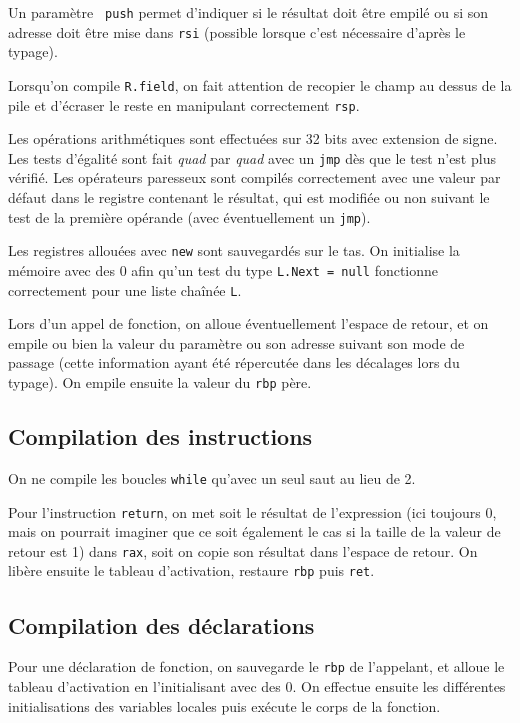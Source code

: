 \documentclass[a4paper, 10pt, french]{article}
\newcommand{\codeAda}[1]{\texttt{#1}}
\newcommand{\codeOCaml}[1]{\texttt{#1}}
\newcommand{\codeASM}[1]{\texttt{#1}}
\newcommand{\foreign}{\emph}
\begin{document}
Un paramètre \codeOCaml{~push} permet d'indiquer si le résultat doit être empilé ou si son adresse doit être mise dans \codeASM{rsi} (possible lorsque c'est nécessaire d'après le typage).

Lorsqu'on compile \codeAda{R.field}, on fait attention de recopier le champ au dessus de la pile et d'écraser le reste en manipulant correctement \codeASM{rsp}.

Les opérations arithmétiques sont effectuées sur 32 bits avec extension de signe. Les tests d'égalité sont fait \foreign{quad} par \foreign{quad} avec un \codeASM{jmp} dès que le test n'est plus vérifié. Les opérateurs paresseux sont compilés correctement avec une valeur par défaut dans le registre contenant le résultat, qui est modifiée ou non suivant le test de la première opérande (avec éventuellement un \codeASM{jmp}).

Les registres allouées avec \codeAda{new} sont sauvegardés sur le tas. On initialise la mémoire avec des 0 afin qu'un test du type \codeAda{L.Next = null} fonctionne correctement pour une liste chaînée \codeAda{L}.

Lors d'un appel de fonction, on alloue éventuellement l'espace de retour, et on empile ou bien la valeur du paramètre ou son adresse suivant son mode de passage (cette information ayant été répercutée dans les décalages lors du typage). On empile ensuite la valeur du \codeASM{rbp} père.

\subsection{Compilation des instructions}

On ne compile les boucles \codeAda{while} qu'avec un seul saut au lieu de 2.

Pour l'instruction \codeAda{return}, on met soit le résultat de l'expression (ici toujours 0, mais on pourrait imaginer que ce soit également le cas si la taille de la valeur de retour est 1) dans \codeASM{rax}, soit on copie son résultat dans l'espace de retour. On libère ensuite le tableau d'activation, restaure \codeASM{rbp} puis \codeASM{ret}.

\subsection{Compilation des déclarations}

Pour une déclaration de fonction, on sauvegarde le \codeASM{rbp} de l'appelant, et alloue le tableau d'activation en l'initialisant avec des 0. On effectue ensuite les différentes initialisations des variables locales puis exécute le corps de la fonction.
\end{document}
